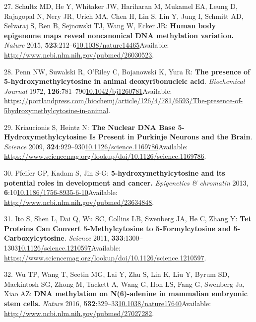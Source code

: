\documentclass[
]{book}
\begin{document}
\leavevmode\hypertarget{ref-Schultz2015}{}%
27. Schultz MD, He Y, Whitaker JW, Hariharan M, Mukamel EA, Leung D, Rajagopal N, Nery JR, Urich MA, Chen H, Lin S, Lin Y, Jung I, Schmitt AD, Selvaraj S, Ren B, Sejnowski TJ, Wang W, Ecker JR: \textbf{Human body epigenome maps reveal noncanonical DNA methylation variation.} \emph{Nature} 2015, \textbf{523}:212--6\href{https://doi.org/10.1038/nature14465}{10.1038/nature14465}Available: \url{http://www.ncbi.nlm.nih.gov/pubmed/26030523}.

\leavevmode\hypertarget{ref-Penn1972}{}%
28. Penn NW, Suwalski R, O'Riley C, Bojanowski K, Yura R: \textbf{The presence of 5-hydroxymethylcytosine in animal deoxyribonucleic acid}. \emph{Biochemical Journal} 1972, \textbf{126}:781--790\href{https://doi.org/10.1042/bj1260781}{10.1042/bj1260781}Available: \url{https://portlandpress.com/biochemj/article/126/4/781/6593/The-presence-of-5hydroxymethylcytosine-in-animal}.

\leavevmode\hypertarget{ref-Kriaucionis2009}{}%
29. Kriaucionis S, Heintz N: \textbf{The Nuclear DNA Base 5-Hydroxymethylcytosine Is Present in Purkinje Neurons and the Brain}. \emph{Science} 2009, \textbf{324}:929--930\href{https://doi.org/10.1126/science.1169786}{10.1126/science.1169786}Available: \url{https://www.sciencemag.org/lookup/doi/10.1126/science.1169786}.

\leavevmode\hypertarget{ref-Pfeifer2013}{}%
30. Pfeifer GP, Kadam S, Jin S-G: \textbf{5-hydroxymethylcytosine and its potential roles in development and cancer.} \emph{Epigenetics \& chromatin} 2013, \textbf{6}:10\href{https://doi.org/10.1186/1756-8935-6-10}{10.1186/1756-8935-6-10}Available: \url{http://www.ncbi.nlm.nih.gov/pubmed/23634848}.

\leavevmode\hypertarget{ref-Ito2011}{}%
31. Ito S, Shen L, Dai Q, Wu SC, Collins LB, Swenberg JA, He C, Zhang Y: \textbf{Tet Proteins Can Convert 5-Methylcytosine to 5-Formylcytosine and 5-Carboxylcytosine}. \emph{Science} 2011, \textbf{333}:1300--1303\href{https://doi.org/10.1126/science.1210597}{10.1126/science.1210597}Available: \url{https://www.sciencemag.org/lookup/doi/10.1126/science.1210597}.

\leavevmode\hypertarget{ref-Wu2016}{}%
32. Wu TP, Wang T, Seetin MG, Lai Y, Zhu S, Lin K, Liu Y, Byrum SD, Mackintosh SG, Zhong M, Tackett A, Wang G, Hon LS, Fang G, Swenberg Ja, Xiao AZ: \textbf{DNA methylation on N(6)-adenine in mammalian embryonic stem cells.} \emph{Nature} 2016, \textbf{532}:329--33\href{https://doi.org/10.1038/nature17640}{10.1038/nature17640}Available: \url{http://www.ncbi.nlm.nih.gov/pubmed/27027282}.
\end{document}
